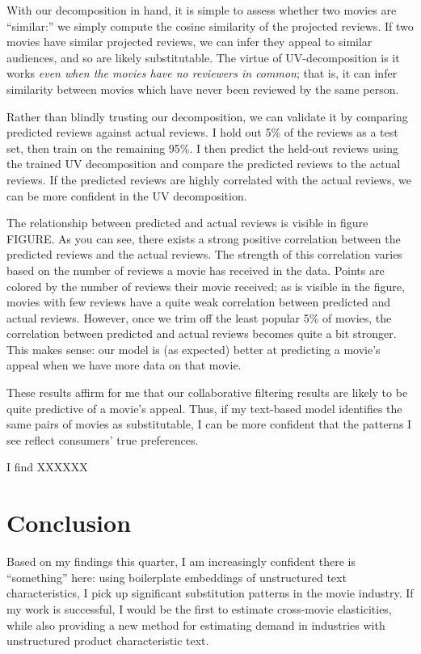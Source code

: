 \documentclass{article}
\begin{document}
With our decomposition in hand, it is simple to assess whether two movies are ``similar:'' we simply compute the cosine similarity of the projected reviews. If two movies have similar projected reviews, we can infer they appeal to similar audiences, and so are likely substitutable. The virtue of UV-decomposition is it works \emph{even when the movies have no reviewers in common}; that is, it can infer similarity between movies which have never been reviewed by the same person.

Rather than blindly trusting our decomposition, we can validate it by comparing predicted reviews against actual reviews. I hold out 5\% of the reviews as a test set, then train on the remaining 95\%. I then predict the held-out reviews using the trained UV decomposition and compare the predicted reviews to the actual reviews. If the predicted reviews are highly correlated with the actual reviews, we can be more confident in the UV decomposition.

The relationship between predicted and actual reviews is visible in figure FIGURE. As you can see, there exists a strong positive correlation between the predicted reviews and the actual reviews. The strength of this correlation varies based on the number of reviews a movie has received in the data. Points are colored by the number of reviews their movie received; as is visible in the figure, movies with few reviews have a quite weak correlation between predicted and actual reviews. However, once we trim off the least popular 5\% of movies, the correlation between predicted and actual reviews becomes quite a bit stronger. This makes sense: our model is (as expected) better at predicting a movie's appeal when we have more data on that movie.

These results affirm for me that our collaborative filtering results are likely to be quite predictive of a movie's appeal. Thus, if my text-based model identifies the same pairs of movies as substitutable, I can be more confident that the patterns I see reflect consumers' true preferences. 

I find XXXXXX



\section{Conclusion}

Based on my findings this quarter, I am increasingly confident there is ``something'' here: using boilerplate embeddings of unstructured text characteristics, I pick up significant substitution patterns in the movie industry. If my work is successful, I would be the first to estimate cross-movie elasticities, while also providing a new method for estimating demand in industries with unstructured product characteristic text.
\end{document}

